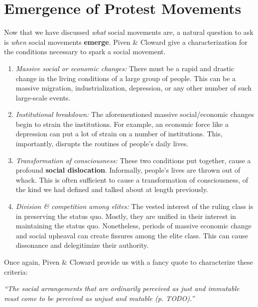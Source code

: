 \section{Emergence of Protest Movements}
Now that we have discussed \textit{what} social movements are, a natural question to ask is \textit{when} social movements \textbf{emerge}.
Piven \& Cloward give a characterization for the conditions necessary to spark a social movement.

\begin{enumerate}
    \item \textit{Massive social or economic changes:}
    There must be a rapid and drastic change in the living conditions of a large group of people.
    This can be a massive migration, industrialization, depression, or any other number of such large-scale events.
    \item \textit{Institutional breakdown:}
    The aforementioned massive social/economic changes begin to strain the institutions.
    For example, an economic force like a depression can put a lot of strain on a number of institutions.
    This, importantly, disrupts the routines of people's daily lives.
    \item \textit{Transformation of consciousness:} 
    These two conditions put together, cause a profound \textbf{social dislocation}.
    Informally, people's lives are thrown out of whack.
    This is often sufficient to cause a transformation of consciousness, of the kind we had defined and talked about at length previously.
    \item \textit{Division \& competition among elites:}
    The vested interest of the ruling class is in preserving the status quo.
    Mostly, they are unified in their interest in maintaining the status quo.
    Nonetheless, periods of massive economic change and social upheaval can create fissures among the elite class.
    This can cause dissonance and delegitimize their authority.

\end{enumerate}
Once again, Piven \& Cloward provide us with a fancy quote to characterize these criteria:
\begin{center}
\textit{``The social arrangements that are ordinarily perceived as just and immutable must come to be perceived as unjust and mutable (p. TODO).''}
\end{center}

